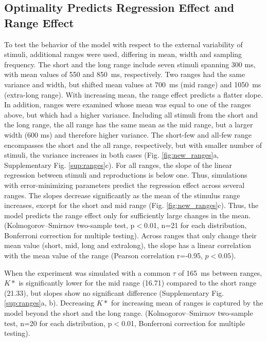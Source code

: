 \documentclass[10pt]{article}
\begin{document}
\subsection{Optimality Predicts Regression Effect and Range Effect}
To test the behavior of the model with respect to the external variability of stimuli, additional ranges were used, differing in mean, width and sampling frequency.
The short and the long range include seven stimuli spanning 300 ms, with mean values of 550 and 850~ms, respectively. 
Two ranges had the same variance and width, but shifted mean values at 700~ms (mid range) and 1050~ms (extra-long range). With increasing mean, the range effect predicts a flatter slope. 
In addition, ranges were examined whose mean was equal to one of the ranges above, but which had a higher variance.
Including all stimuli from the short and the long range, the all range has the same mean as the mid range, but a larger width (600 ms) and therefore higher variance.
The short-few and all-few range encompasses the short and the all range, respectively, but with smaller number of stimuli, the variance increases in both cases 
(Fig. \ref{fig:new_ranges}a, Supplementary Fig. \ref{sup:ranges}c).
For all ranges, the slope of the linear regression between stimuli and reproductions is below one. Thus, simulations with error-minimizing parameters predict the regression effect across several ranges. 
The slopes decrease significantly as the mean of the stimulus range increases, except for the short and mid range (Fig. \ref{fig:new_ranges}c).
Thus, the model predicts the range effect only for sufficiently large changes in the mean. 
(Kolmogorov–Smirnov two-sample test, p$<$0.01, n=21 for each distribution, Bonferroni correction for multiple testing).
Across ranges that only change their mean value (short, mid, long and extralong), the slope has a linear correlation with the mean value of the range (Pearson correlation r=-0.95, $p<0.05$).

When the experiment was simulated with a common $\tau$ of 165~ms between ranges, $K*$ is significantly lower for the mid range (16.71) compared to the short range (21.33), but slopes show no significant difference (Supplementary Fig. \ref{sup:ranges}a, b).
Decreasing $K*$ for increasing mean of ranges is captured by the model beyond the short and the long range.
(Kolmogorov–Smirnov two-sample test, n=20 for each distribution, p$<$0.01, Bonferroni correction for multiple testing).\\
\end{document}
